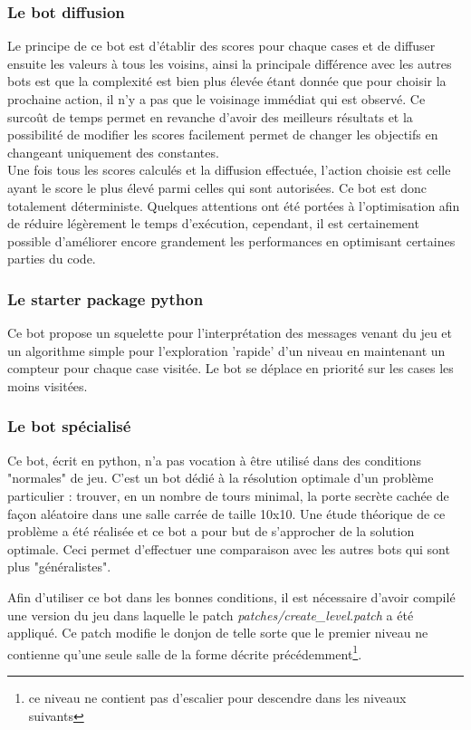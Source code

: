 \documentclass[a4paper,12pt]{article}
\begin{document}
\subsubsection{Le bot diffusion}
Le principe de ce bot est d'établir des scores pour chaque cases et de diffuser
ensuite les valeurs à tous les voisins, ainsi la principale différence avec les
autres bots est que la complexité est bien plus élevée étant donnée que pour
choisir la prochaine action, il n'y a pas que le voisinage immédiat qui est
observé. Ce surcoût de temps permet en revanche d'avoir des meilleurs résultats
et la possibilité de modifier les scores facilement permet de changer les
objectifs en changeant uniquement des constantes.
\\
Une fois tous les scores calculés et la diffusion effectuée, l'action choisie
est celle ayant le score le plus élevé parmi celles qui sont autorisées. Ce bot
est donc totalement déterministe. Quelques attentions ont été portées à
l'optimisation afin de réduire légèrement le temps d'exécution, cependant, il
est certainement possible d'améliorer encore grandement les performances en
optimisant certaines parties du code.

\subsubsection{Le starter package python}

Ce bot propose un squelette pour l'interprétation des messages venant du jeu
et un algorithme simple pour l'exploration 'rapide' d'un niveau en maintenant
un compteur pour chaque case visitée. Le bot se déplace en priorité sur les
cases les moins visitées.

\subsubsection{Le bot spécialisé}

Ce bot, écrit en python, n'a pas vocation à être utilisé dans des conditions
"normales" de jeu. C'est un bot dédié à la résolution optimale d'un problème
particulier : trouver, en un nombre de tours minimal, la porte secrète cachée
de façon aléatoire dans une salle carrée de taille 10x10. Une étude théorique
de ce problème a été réalisée et ce bot a pour but de s'approcher de la
solution optimale. Ceci permet d'effectuer une comparaison avec les autres
bots qui sont plus "généralistes".

Afin d'utiliser ce bot dans les bonnes conditions, il est nécessaire d'avoir
compilé une version du jeu dans laquelle le patch
\emph{patches/create\_level.patch} a été appliqué. Ce patch modifie le donjon
de telle sorte que le premier niveau ne contienne qu'une seule salle de la
forme décrite précédemment\footnote{ce niveau ne contient pas d'escalier pour
descendre dans les niveaux suivants}.
\end{document}
